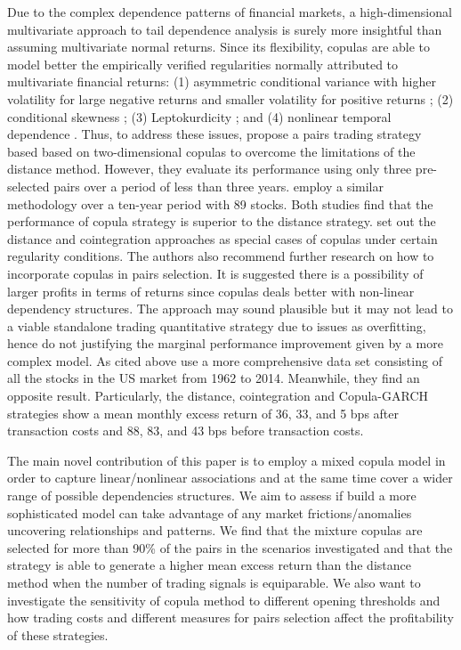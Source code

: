 \documentclass[a4paper,12pt]{report}
\begin{document}
\begin{refsection}
	Due to the complex dependence patterns of financial markets, a high-dimensional multivariate approach to tail dependence analysis is surely more insightful than assuming multivariate normal returns. Since its flexibility, copulas are able to model better the empirically verified regularities normally attributed to multivariate financial returns: (1) asymmetric conditional variance with higher volatility for large negative returns and smaller volatility for positive returns \citep{h98}; (2) conditional skewness \citep{ait01,chen01,patton01}; (3) Leptokurdicity \citep{t01,andreou01}; and (4) nonlinear temporal dependence \citep{cont01,campbell97}. Thus, to address these issues, \citet*{lw2013} propose a pairs trading strategy based based on two-dimensional copulas to overcome the limitations of the distance method. However, they evaluate its performance using only three pre-selected pairs over a period of less than three years. \citet*{xie14} employ a similar methodology over a ten-year period with 89 stocks. Both studies find that the performance of copula strategy is superior to the distance strategy. \citet*{xw13} set out the distance and cointegration approaches as special cases of copulas under certain regularity conditions. The authors also recommend further research on how to incorporate copulas in pairs selection. It is suggested there is a possibility of larger profits in terms of returns since copulas deals better with non-linear dependency structures. The approach may sound plausible but it may not lead to a viable standalone trading quantitative strategy due to issues as overfitting, hence do not justifying the marginal performance improvement given by a more complex model. As cited above \citet*{rf15} use a more comprehensive data set consisting of all the stocks in the US market from 1962 to 2014. Meanwhile, they find an opposite result. Particularly, the distance, cointegration and Copula-GARCH strategies show a mean monthly excess return of 36, 33, and 5 bps after transaction costs and 88, 83, and 43 bps before transaction costs.
	
	The main novel contribution of this paper is to employ a mixed copula model in order to capture linear/nonlinear associations and at the same time cover a wider range of possible dependencies structures. We aim to assess if build a more sophisticated model can take advantage of any market frictions/anomalies uncovering relationships and patterns. We find that the mixture copulas are selected for more than 90\% of the pairs in the scenarios investigated and that the strategy is able 
	to generate a higher mean excess return than the distance method when the 
	number of trading signals is equiparable. We also want to investigate the sensitivity of copula method to different opening thresholds and how trading costs and different measures for pairs selection affect the profitability of these strategies.
	

\end{refsection}
\end{document}
